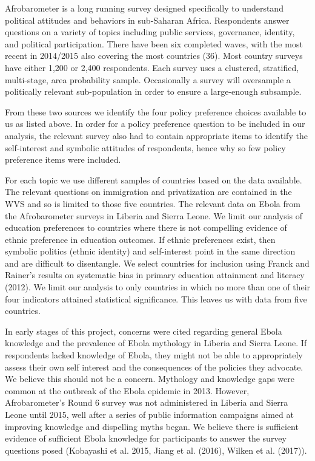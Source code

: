 \documentclass[]{article}
\begin{document}
Afrobarometer is a long running survey designed specifically to
understand political attitudes and behaviors in sub-Saharan Africa.
Respondents answer questions on a variety of topics including public
services, governance, identity, and political participation. There have
been six completed waves, with the most recent in 2014/2015 also
covering the most countries (36). Most country surveys have either 1,200
or 2,400 respondents. Each survey uses a clustered, stratified,
multi-stage, area probability sample. Occasionally a survey will
oversample a politically relevant sub-population in order to ensure a
large-enough subsample.

From these two sources we identify the four policy preference choices
available to us as listed above. In order for a policy preference
question to be included in our analysis, the relevant survey also had to
contain appropriate items to identify the self-interest and symbolic
attitudes of respondents, hence why so few policy preference items were
included.

For each topic we use different samples of countries based on the data
available. The relevant questions on immigration and privatization are
contained in the WVS and so is limited to those five countries. The
relevant data on Ebola from the Afrobarometer surveys in Liberia and
Sierra Leone. We limit our analysis of education preferences to
countries where there is not compelling evidence of ethnic preference in
education outcomes. If ethnic preferences exist, then symbolic politics
(ethnic identity) and self-interest point in the same direction and are
difficult to disentangle. We select countries for inclusion using Franck
and Rainer's results on systematic bias in primary education attainment
and literacy (2012). We limit our analysis to only countries in which no
more than one of their four indicators attained statistical
significance. This leaves us with data from five countries.

In early stages of this project, concerns were cited regarding general
Ebola knowledge and the prevalence of Ebola mythology in Liberia and
Sierra Leone. If respondents lacked knowledge of Ebola, they might not
be able to appropriately assess their own self interest and the
consequences of the policies they advocate. We believe this should not
be a concern. Mythology and knowledge gaps were common at the outbreak
of the Ebola epidemic in 2013. However, Afrobarometer's Round 6 survey
was not administered in Liberia and Sierra Leone until 2015, well after
a series of public information campaigns aimed at improving knowledge
and dispelling myths began. We believe there is sufficient evidence of
sufficient Ebola knowledge for participants to answer the survey
questions posed (Kobayashi et al. 2015, Jiang et al. (2016), Wilken et
al. (2017)).
\end{document}
